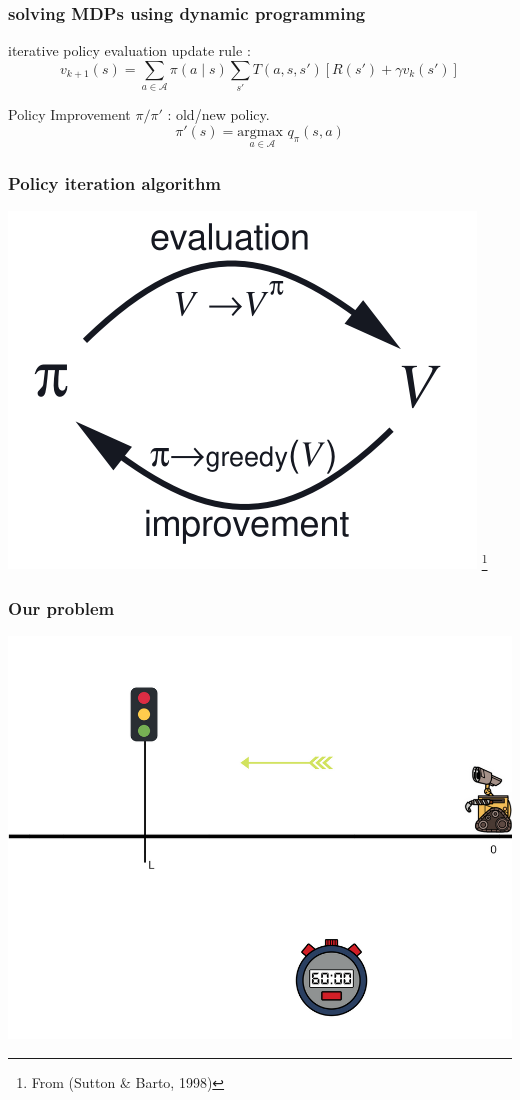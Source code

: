 \documentclass[dvipsnames,svgnames]{beamer}
\begin{document}
\begin{frame}
\frametitle{solving MDPs using dynamic programming}
\begin{block}{iterative policy evaluation}
update rule : 
$$ v_{k+1}(s)=\sum_{a \in \mathcal{A}}\pi(a \mid s)\sum_{s'}T(a,s,s')\left[R(s')+\gamma v_k(s')\right] $$
\end{block}
\pause
\begin{block}{Policy Improvement}
$\pi/\pi'$ : old/new policy.
$$\pi'(s) = \underset{a \in \mathcal{A}}{\text{argmax } } q_{\pi}(s,a) $$
\end{block}

\end{frame}


\begin{frame}
\frametitle{Policy iteration algorithm}
\centering
\includegraphics[scale=0.7]{img/policy_iter_sutton.png}
\footnote{From (Sutton \& Barto, 1998)}

\end{frame}


\begin{frame}
\frametitle{Our problem}
\begin{center}
\includegraphics[scale=0.4]{img/illustration_traffic_light.png}
\end{center}
\end{frame}
\end{document}
